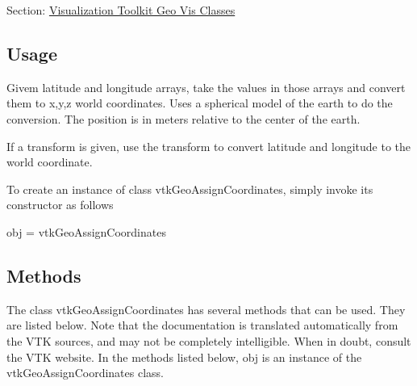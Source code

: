Section\-: \hyperlink{sec_vtkgeovis}{Visualization Toolkit Geo Vis Classes} \hypertarget{vtkwidgets_vtkxyplotwidget_Usage}{}\subsection{Usage}\label{vtkwidgets_vtkxyplotwidget_Usage}
Givem latitude and longitude arrays, take the values in those arrays and convert them to x,y,z world coordinates. Uses a spherical model of the earth to do the conversion. The position is in meters relative to the center of the earth.

If a transform is given, use the transform to convert latitude and longitude to the world coordinate.

To create an instance of class vtk\-Geo\-Assign\-Coordinates, simply invoke its constructor as follows \begin{DoxyVerb}  obj = vtkGeoAssignCoordinates
\end{DoxyVerb}
 \hypertarget{vtkwidgets_vtkxyplotwidget_Methods}{}\subsection{Methods}\label{vtkwidgets_vtkxyplotwidget_Methods}
The class vtk\-Geo\-Assign\-Coordinates has several methods that can be used. They are listed below. Note that the documentation is translated automatically from the V\-T\-K sources, and may not be completely intelligible. When in doubt, consult the V\-T\-K website. In the methods listed below, {\ttfamily obj} is an instance of the vtk\-Geo\-Assign\-Coordinates class. 
